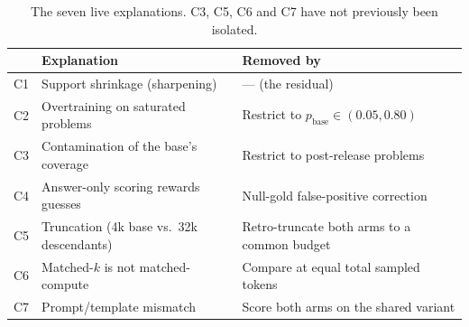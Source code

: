 
\begin{table}[t]
\centering\small
\begin{tabular}{llp{6.2cm}}
\toprule
 & Explanation & Removed by \\
\midrule
C1 & Support shrinkage (sharpening) & --- (the residual) \\
C2 & Overtraining on saturated problems & Restrict to $p_{\text{base}} \in (0.05, 0.80)$ \\
C3 & Contamination of the base's coverage & Restrict to post-release problems \\
C4 & Answer-only scoring rewards guesses & Null-gold false-positive correction \\
C5 & Truncation (4k base vs.\ 32k descendants) & Retro-truncate both arms to a common budget \\
C6 & Matched-$k$ is not matched-compute & Compare at equal total sampled tokens \\
C7 & Prompt/template mismatch & Score both arms on the shared variant \\
\bottomrule
\end{tabular}
\caption{The seven live explanations. C3, C5, C6 and C7 have not previously been isolated.}
\label{tab:confounds}
\end{table}

